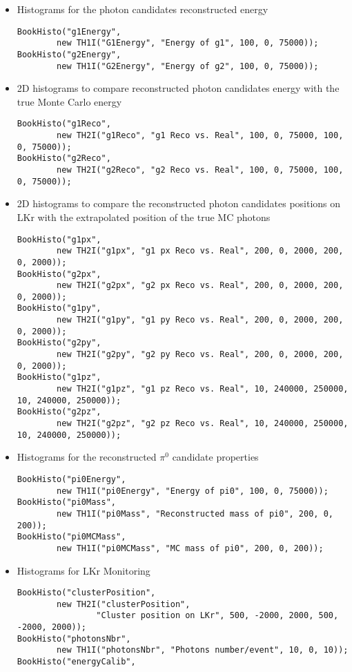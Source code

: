 \begin{itemize}
  \item Histograms for the photon candidates reconstructed energy 
\begin{lstlisting}
BookHisto("g1Energy", 
		new TH1I("G1Energy", "Energy of g1", 100, 0, 75000));
BookHisto("g2Energy", 
		new TH1I("G2Energy", "Energy of g2", 100, 0, 75000));
\end{lstlisting}
	\item 2D histograms to compare reconstructed photon candidates energy with the true Monte Carlo
	energy
\begin{lstlisting}
BookHisto("g1Reco", 
		new TH2I("g1Reco", "g1 Reco vs. Real", 100, 0, 75000, 100, 0, 75000));
BookHisto("g2Reco", 
		new TH2I("g2Reco", "g2 Reco vs. Real", 100, 0, 75000, 100, 0, 75000));
\end{lstlisting}
	\item 2D histograms to compare the reconstructed photon candidates positions on LKr with the
	extrapolated position of the true MC photons
\begin{lstlisting}
BookHisto("g1px", 
		new TH2I("g1px", "g1 px Reco vs. Real", 200, 0, 2000, 200, 0, 2000));
BookHisto("g2px", 
		new TH2I("g2px", "g2 px Reco vs. Real", 200, 0, 2000, 200, 0, 2000));
BookHisto("g1py", 
		new TH2I("g1py", "g1 py Reco vs. Real", 200, 0, 2000, 200, 0, 2000));
BookHisto("g2py", 
		new TH2I("g2py", "g2 py Reco vs. Real", 200, 0, 2000, 200, 0, 2000));
BookHisto("g1pz", 
		new TH2I("g1pz", "g1 pz Reco vs. Real", 10, 240000, 250000, 10, 240000, 250000));
BookHisto("g2pz", 
		new TH2I("g2pz", "g2 pz Reco vs. Real", 10, 240000, 250000, 10, 240000, 250000));
\end{lstlisting}
	\item Histograms for the reconstructed $\pi^0$ candidate properties
\begin{lstlisting}
BookHisto("pi0Energy", 
		new TH1I("pi0Energy", "Energy of pi0", 100, 0, 75000));
BookHisto("pi0Mass", 
		new TH1I("pi0Mass", "Reconstructed mass of pi0", 200, 0, 200));
BookHisto("pi0MCMass", 
		new TH1I("pi0MCMass", "MC mass of pi0", 200, 0, 200));
\end{lstlisting}
	\item Histograms for LKr Monitoring
\begin{lstlisting}
BookHisto("clusterPosition", 
		new TH2I("clusterPosition", 
				"Cluster position on LKr", 500, -2000, 2000, 500, -2000, 2000));
BookHisto("photonsNbr", 
		new TH1I("photonsNbr", "Photons number/event", 10, 0, 10));
BookHisto("energyCalib", 

\end{lstlisting}
\end{itemize}
